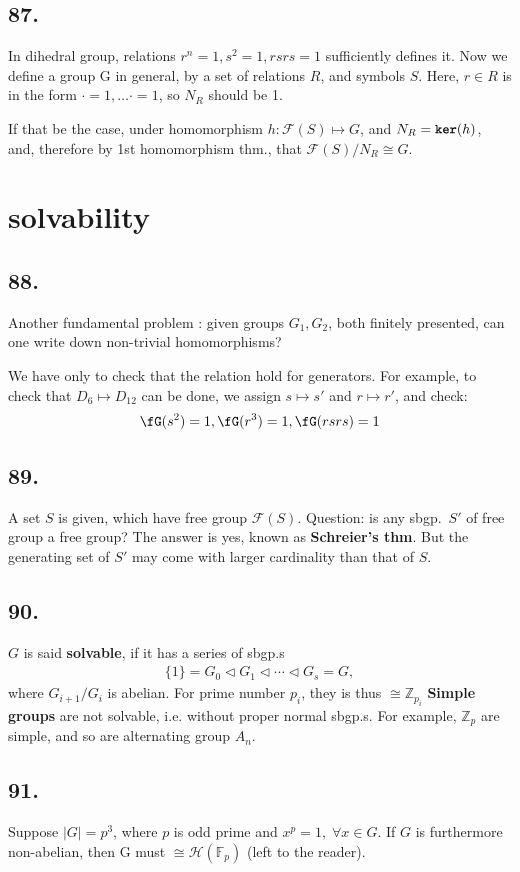\documentclass[12pt]{article}
\newcommand\Ev\forall%
\newcommand\Mp\mapsto%
\newcommand{\BF}[1]{ \mathbb{#1} }%
\newcommand{\CF}[1]{ \mathcal{#1} }%
\newcommand{\Ss}[1]{\textsf{\textbf{#1}}}%
\newcommand{\Tw}[1]{\texttt{\textbf{#1}}}%
\newcommand{\EqGo}[1]{ \begin{gather*}{#1}\end{gather*} } %
\begin{document}
\subsection*{87.} In dihedral group, relations \(r^n = 1, s^2 = 1, rsrs = 1\) sufficiently defines it. 
Now we define a group G in general, by a set of relations \(R\), and symbols \(S\). 
Here, \(r \in R\) is in the form \(\cdot=1, \dotsc \cdot=1\), so \(N_R\) should be 1. \par
If that be the case, under homomorphism \(h: \CF F(S) \Mp G\), and \(N_R = \Tw{ker}(h)\), and, therefore by 1st homomorphism thm., that \(\CF F(S) / N_R \cong G\). 

\section{solvability}
\subsection*{88.} Another fundamental problem : given groups \(G_1, G_2\), both finitely presented, can one write down non-trivial homomorphisms? \par
We have only to check that the relation hold for generators. For example, to check that \(D_6 \Mp D_{12}\) can be done, 
we assign \(s \Mp s'\) and \(r \Mp r'\), 
and check: \EqGo{
 \fG( s^2 ) = 1, \fG(r^3) = 1, \fG(rsrs) =1
}

\subsection*{89.} A set \(S\) is given, which have free group \(\CF F(S)\). Question: is any sbgp.\ \(S'\) of free group a free group? 
The answer is yes, known as \Ss{Schreier's thm}. 
But the generating set of \(S'\) may come with larger cardinality than that of \(S\).

\subsection*{90.} \(G\) is said \Ss{solvable}, if it has a series of sbgp.s \EqGo{
 \{1\} = G_0 \lhd G_1 \lhd \dotsb \lhd G_s = G, 
} where \(G_{i+1}/G_i\) is abelian. 
For prime number \(p_i\), they is thus \(\cong \BF Z_{p_i}\) 
\Ss{Simple groups} are not solvable, i.e. without proper normal sbgp.s. 
For example, \(\BF Z_p\) are simple, and so are alternating group \(A_n\). 

\subsection*{91.} Suppose \(|G| = p^3\), where \(p\) is odd prime and \(x^p = 1,\; \Ev x \in G\). 
If \(G\) is furthermore non-abelian, then G must \(\cong \CF H(\BF F_p)\) (left to the reader). 
\end{document}
